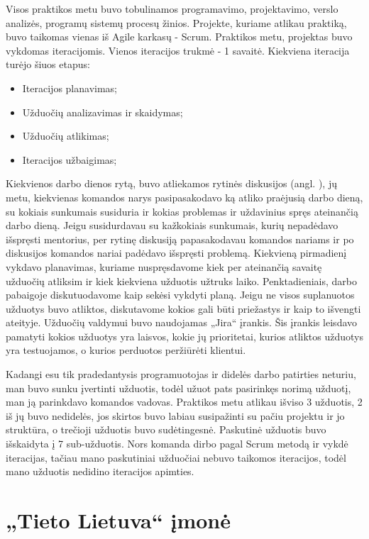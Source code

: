 \documentclass{VUMIFPSbakalaurinis}
\begin{document}
Visos praktikos metu buvo tobulinamos programavimo, projektavimo, verslo analizės, programų sistemų procesų žinios. Projekte, kuriame atlikau praktiką, buvo taikomas vienas iš Agile karkasų - Scrum. Praktikos metu, projektas buvo vykdomas iteracijomis. Vienos iteracijos trukmė - 1 savaitė. Kiekviena iteracija turėjo šiuos etapus:
\begin{itemize}
    \item Iteracijos planavimas;
    \item Užduočių analizavimas ir skaidymas;
    \item Užduočių atlikimas;
    \item Iteracijos užbaigimas;
\end{itemize}
Kiekvienos darbo dienos rytą, buvo atliekamos rytinės diskusijos (angl. ), jų metu, kiekvienas komandos narys pasipasakodavo ką atliko praėjusią darbo dieną, su kokiais sunkumais susiduria ir kokias problemas ir uždavinius spręs ateinančią darbo dieną. Jeigu susidurdavau su kažkokiais sunkumais, kurių nepadėdavo išspręsti mentorius, per rytinę diskusiją papasakodavau komandos nariams ir po diskusijos komandos nariai padėdavo išspręsti problemą. Kiekvieną pirmadienį vykdavo planavimas, kuriame nuspręsdavome kiek per ateinančią savaitę užduočių atliksim ir kiek kiekviena užduotis užtruks laiko. Penktadieniais, darbo pabaigoje diskutuodavome kaip sekėsi vykdyti planą. Jeigu ne visos suplanuotos užduotys buvo atliktos, diskutavome kokios gali būti priežastys ir kaip to išvengti ateityje. Užduočių valdymui buvo naudojamas „Jira“ įrankis. Šis įrankis leisdavo pamatyti kokios užduotys yra laisvos, kokie jų prioritetai, kurios atliktos užduotys yra testuojamos, o kurios perduotos peržiūrėti klientui.


Kadangi esu tik pradedantysis programuotojas ir didelės darbo patirties neturiu, man buvo sunku įvertinti užduotis, todėl užuot pats pasirinkęs norimą užduotį, man ją parinkdavo komandos vadovas. Praktikos metu atlikau išviso 3 užduotis, 2 iš jų buvo nedidelės, jos skirtos buvo labiau susipažinti su pačiu projektu ir jo struktūra, o trečioji užduotis buvo sudėtingesnė. Paskutinė užduotis buvo išskaidyta į 7 sub-užduotis. Nors komanda dirbo pagal Scrum metodą ir vykdė iteracijas, tačiau mano paskutiniai užduočiai nebuvo taikomos iteracijos, todėl mano užduotis nedidino iteracijos apimties.

\section{„Tieto Lietuva“ įmonė}
\end{document}
